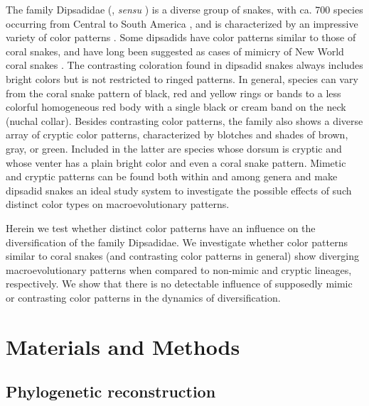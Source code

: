 The family Dipsadidae (\citealp{zaher_2009}, \textit{sensu} \citealp{grazziotin_molecular_2012}) is a diverse group of snakes, with ca. 700 species occurring from Central to South America \citep{grazziotin_molecular_2012, uetz_2014}, and is characterized by an impressive variety of color patterns \citep[see][for some examples]{martins_1998}. Some dipsadids have color patterns similar to those of coral snakes, and have long been suggested as cases of mimicry of New World coral snakes \citep[family Elapidae;][]{wallace_1867, greene_coral_1981, sazima_1991, savage_1992, martins_1993, pough_1988, almeida_morphological_2014}. The contrasting coloration found in dipsadid snakes always includes bright colors but is not restricted to ringed patterns. In general, species can vary from the coral snake pattern of black, red and yellow rings or bands to a less colorful homogeneous red body with a single black or cream band on the neck (nuchal collar). Besides contrasting color patterns, the family also shows a diverse array of cryptic color patterns, characterized by blotches and shades of brown, gray, or green. Included in the latter are species whose dorsum is cryptic and whose venter has a plain bright color and even a coral snake pattern. Mimetic and cryptic patterns can be found both within and among genera and make dipsadid snakes an ideal study system to investigate the possible effects of such distinct color types on macroevolutionary patterns.

Herein we test whether distinct color patterns have an influence on the diversification of the family Dipsadidae. We investigate whether color patterns similar to coral snakes (and contrasting color patterns in general) show diverging macroevolutionary patterns when compared to non-mimic and cryptic lineages, respectively. We show that there is no detectable influence of supposedly mimic or contrasting color patterns in the dynamics of diversification.

\section{Materials and Methods}

\subsection{Phylogenetic reconstruction}

